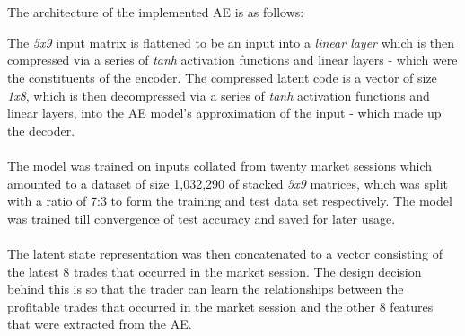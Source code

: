 \documentclass[ %
                    author={Ashwinder Khurana},
                supervisor={Prof Dave Cliff},
                    degree={MEng},
                     title={The Deeply Reinforced Trader},
                  subtitle={},
                      type={enterprise},
                      year={2020} ]{dissertation}
\begin{document}
{\\
\\
The architecture of the implemented AE is as follows:
\begin{figure}[H]
\label{fig:AE-arch}  
\end{figure}
\noindent 
The \textit{5x9} input matrix is flattened to be an input into a \textit{linear layer} which is then compressed via a series of \textit{tanh} activation functions and linear layers - which were the constituents of the encoder. The compressed latent code is a vector of size \textit{1x8}, which is then decompressed via a series of \textit{tanh} activation functions and linear layers, into the AE model's approximation of the input - which made up the decoder. 
\\
\\
The model was trained on inputs collated from twenty market sessions which amounted to a dataset of size 1,032,290 of stacked \textit{5x9} matrices, which was split with a ratio of 7:3 to form the training and test data set respectively. The model was trained till convergence of test accuracy and saved for later usage. {\color{red}{specify accuracy + talk about how the error is minimised between the input and output of decoder}} 
\\
\\
The latent state representation was then concatenated to a vector consisting of the latest 8 trades that occurred in the market session. The design decision behind this is so that the trader can learn the relationships between the profitable trades that occurred in the market session and the other 8 features that were extracted from the AE. 
\\
\\
}
\end{document}
